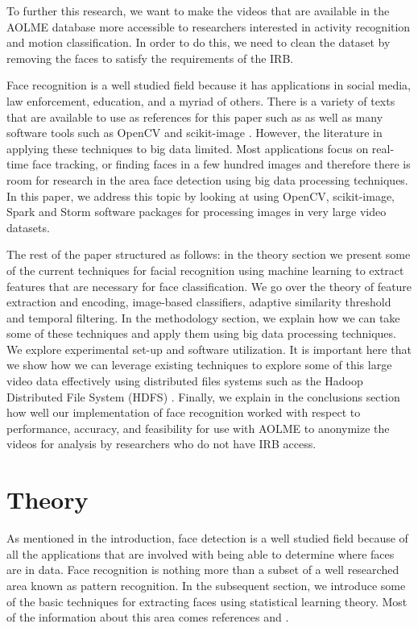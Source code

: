 \documentclass[
	submission,
	final,
	notitlepage,
	narroweqnarray,
	inline,
	twoside,
	]{ieee}
\begin{document}
To further this research, we want to make the videos that are available
in the AOLME database more accessible to researchers interested in
activity recognition and motion classification. In order to do this,
we need to clean the dataset by removing the faces to satisfy the requirements
of the IRB.

Face recognition is a well studied field because it has applications in
social media, law enforcement, education, and a myriad of others. There is a
variety of texts that are available to use as references for this paper such
as \cite{face_recog_book} \cite{kernel_learning} \cite{machine_face_recog}
as well as many software tools such as OpenCV \cite{opencv} and scikit-image
\cite{scikit-image}. However, the literature in applying these techniques to
big data limited. Most applications focus on real-time face tracking, or finding
faces in a few hundred images and therefore there is room for research in the area
face detection using big data processing techniques. In this paper, we address
this topic by looking at using OpenCV, scikit-image,
Spark and Storm software packages for processing images in very large
video datasets.

The rest of the paper structured as follows: in the theory section we
present some of the current techniques for facial recognition using
machine learning to extract features that are necessary for face
classification. We go over the theory of feature extraction and encoding,
image-based classifiers, adaptive similarity threshold and temporal filtering.
In the methodology section, we explain how we can take some of these
techniques and apply them using big data processing techniques.
We explore experimental set-up and software utilization. It is
important here that we show how we can leverage existing techniques
to explore some of this large video data effectively using distributed
files systems such as the Hadoop Distributed File System (HDFS) \cite{hadoop}.
Finally, we explain in the conclusions section how well our
implementation of face recognition worked with respect to
performance, accuracy, and feasibility for use with AOLME to
 anonymize the videos for analysis by researchers who do not have
IRB access.

\section{Theory}
\PARstart As mentioned in the introduction, face detection is a well
studied field because of all the applications that are involved with
being able to determine where faces are in data. Face recognition
is nothing more than a subset of a well researched area known as
pattern recognition. In the subsequent section, we introduce some
of the basic techniques for extracting faces using statistical
learning theory. Most of the information about this area comes
references \cite{face_recog_book} and \cite{kernel_learning}.
\end{document}
